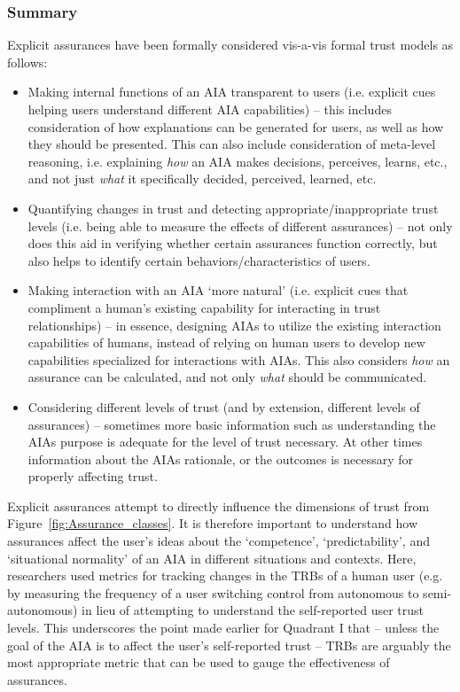 \subsubsection{Summary}
Explicit assurances have been formally considered vis-a-vis formal trust models as follows:
\begin{itemize}
    \item Making internal functions of an AIA transparent to users (i.e. explicit cues helping users understand different AIA capabilities) -- this includes consideration of how explanations can be generated for users, as well as how they should be presented. This can also include consideration of meta-level reasoning, i.e. explaining \textit{how} an AIA makes decisions, perceives, learns, etc., and not just \textit{what} it specifically decided, perceived, learned, etc. 
    \item Quantifying changes in trust and detecting appropriate/inappropriate trust levels (i.e. being able to measure the effects of different assurances) -- not only does this aid in verifying whether certain assurances function correctly, but also helps to identify certain behaviors/characteristics of users.
    \item Making interaction with an AIA `more natural' (i.e. explicit cues that compliment a human's existing capability for interacting in trust relationships) -- in essence, designing AIAs to utilize the existing interaction capabilities of humans, instead of relying on human users to develop new capabilities specialized for interactions with AIAs. This also considers \emph{how} an assurance can be calculated, and not only \emph{what} should be communicated. 
    \item Considering different levels of trust (and by extension, different levels of assurances) -- sometimes more basic information such as understanding the AIAs purpose is adequate for the level of trust necessary. At other times information about the AIAs rationale, or the outcomes is necessary for properly affecting trust.
\end{itemize}

Explicit assurances attempt to directly influence the dimensions of trust from Figure~\ref{fig:Assurance_classes}. 
It is therefore important to understand how assurances affect the user's ideas about the `competence', `predictability', and `situational normality' of an AIA in different situations and contexts. 
Here, researchers used metrics for tracking changes in the TRBs of a human user (e.g. by measuring the frequency of a user switching control from autonomous to semi-autonomous) in lieu of attempting to understand the self-reported user trust levels. 
This underscores the point made earlier for Quadrant I that -- unless the goal of the AIA is to affect the user's self-reported trust -- TRBs are arguably the most appropriate metric that can be used to gauge the effectiveness of assurances. %
